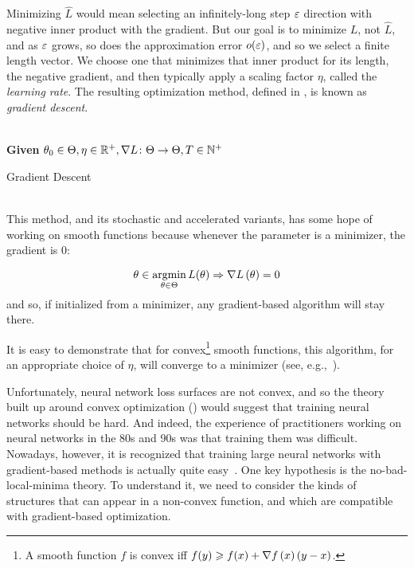 \documentclass[../../thesis.tex]{subfiles}
\begin{document}
Minimizing $\hat{L}$ would mean selecting an infinitely-long step $\varepsilon$
direction with negative inner product with the gradient.
But our goal is to minimize $L$, not $\hat{L}$,
and as $\varepsilon$ grows, so does the approximation error $o(\varepsilon)$,
and so we select a finite length vector.
We choose one that minimizes that inner product for its length,
the negative gradient,
and then typically apply a scaling factor $\eta$,
called the \emph{learning rate}.
The resulting optimization method,
defined in ,
is known as \emph{gradient descent}.
\\\\
\begin{algorithm}[H]
	\SetAlgoLined{}
	\textbf{Given} $\theta_0\in\Theta, \eta\in\mathbb{R}^+, \nabla{L}\colon\Theta\to\Theta, T\in\mathbb{N}^+$\\
	\caption{Gradient Descent}
\end{algorithm}
\ \\
This method,
and its stochastic and accelerated variants,
has some hope of working on smooth functions because
whenever the parameter is a minimizer,
the gradient
is $0$:

\begin{equation}
	\theta \in \mathop{\mathrm{argmin}}_{\theta \in \Theta} L(\theta) \Rightarrow \nabla L\left(\theta\right) = 0
\end{equation}
and so, if initialized from a minimizer,
any gradient-based algorithm will stay there.

It is easy to demonstrate that for
convex\footnote{A smooth function $f$ is convex iff
$f(y) \geqslant f(x) + \nabla f\left(x\right)(y - x)$.}
smooth functions,
this algorithm, for an appropriate choice of $\eta$,
will converge to a minimizer
(see, e.g.,~\cite{boyd2004}).

Unfortunately,
neural network loss surfaces are not convex,
and so the theory built up around convex optimization
(\cite{bubeck,boyd2004})
would suggest that training neural networks should be hard.
And indeed, the experience of practitioners
working on neural networks in the 80s and 90s
was that training them was difficult.
Nowadays, however,
it is recognized that training large neural networks
with gradient-based methods
is actually quite easy~\cite{sun2019}.
One key hypothesis is the
no-bad-local-minima theory.
To understand it,
we need to consider the kinds of structures
that can appear in a non-convex function,
and which are compatible with gradient-based optimization.
\end{document}
